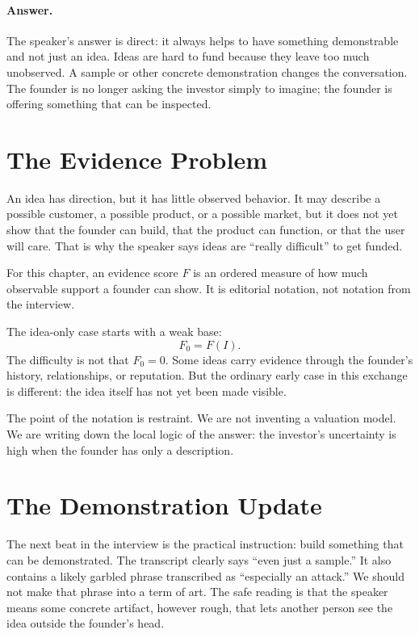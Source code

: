 \paragraph{Answer.}
The speaker's answer is direct: it always helps to have something demonstrable and not just an idea. Ideas are hard to fund because they leave too much unobserved. A sample or other concrete demonstration changes the conversation. The founder is no longer asking the investor simply to imagine; the founder is offering something that can be inspected.

\section{The Evidence Problem}

An idea has direction, but it has little observed behavior. It may describe a possible customer, a possible product, or a possible market, but it does not yet show that the founder can build, that the product can function, or that the user will care. That is why the speaker says ideas are ``really difficult'' to get funded.

\begin{definition}
For this chapter, an evidence score \(F\) is an ordered measure of how much observable support a founder can show. It is editorial notation, not notation from the interview.
\end{definition}

The idea-only case starts with a weak base:
\begin{equation}
F_0 = F(I).
\end{equation}
The difficulty is not that \(F_0=0\). Some ideas carry evidence through the founder's history, relationships, or reputation. But the ordinary early case in this exchange is different: the idea itself has not yet been made visible.

\begin{remark}
The point of the notation is restraint. We are not inventing a valuation model. We are writing down the local logic of the answer: the investor's uncertainty is high when the founder has only a description.
\end{remark}

\section{The Demonstration Update}

The next beat in the interview is the practical instruction: build something that can be demonstrated. The transcript clearly says ``even just a sample.'' It also contains a likely garbled phrase transcribed as ``especially an attack.'' We should not make that phrase into a term of art. The safe reading is that the speaker means some concrete artifact, however rough, that lets another person see the idea outside the founder's head.


